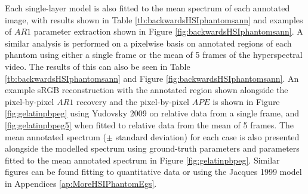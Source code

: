 Each single-layer model is also fitted to the mean spectrum of each annotated image, with results shown in Table \ref{tb:backwardsHSIphantomsann} and examples of $AR1$ parameter extraction shown in Figure \ref{fig:backwardsHSIphantomsann}. A similar analysis is performed on a pixelwise basis on annotated regions of each phantom using either a single frame or the mean of 5 frames of the hyperspectral video. The results of this can also be seen in Table \ref{tb:backwardsHSIphantomsann} and Figure \ref{fig:backwardsHSIphantomsann}.
An example sRGB reconstruction with the annotated region shown alongside the pixel-by-pixel $AR1$ recovery and the pixel-by-pixel $APE$ is shown in Figure \ref{fig:gelatinpbpeg} using Yudovsky 2009 on relative data from a single frame, and \ref{fig:gelatinpbpeg5} when fitted to relative data from the mean of 5 frames. The mean annotated spectrum ($\pm$ standard deviation) for each case is also presented alongside the modelled spectrum using ground-truth parameters and parameters fitted to the mean annotated spectrum in Figure \ref{fig:gelatinpbpeg}. Similar figures can be found fitting to quantitative data or using the Jacques 1999 model in Appendices \ref{ap:MoreHSIPhantomEgs}.

